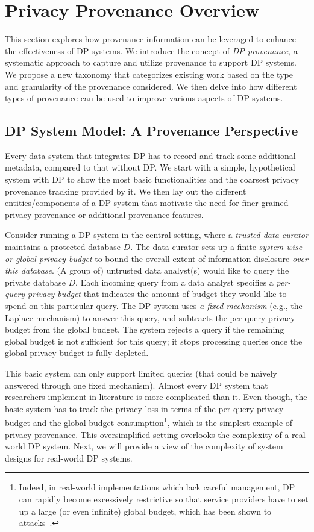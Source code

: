 \section{Privacy Provenance Overview}
This section explores how provenance information can be leveraged to enhance the effectiveness of DP systems. We introduce the concept of \emph{DP provenance}, a systematic approach to capture and utilize provenance to support DP systems. We propose a new taxonomy that categorizes existing work based on the type and granularity of the provenance considered. We then delve into how different types of provenance can be used to improve various aspects of DP systems.

\subsection{DP System Model: A Provenance Perspective}
\label{sec:dpsystem}
Every data system that integrates DP has to record and track some additional metadata, compared to that without DP.
We start with a simple, hypothetical system with DP to show the most basic functionalities and the coarsest privacy provenance tracking provided by it.
We then lay out the different entities/components of a DP system that motivate the need for finer-grained privacy provenance or additional provenance features.

Consider running a DP system in the central setting, where a \emph{trusted data curator} maintains a protected database $D$.
The data curator sets up a finite \emph{system-wise or global privacy budget} to bound the overall extent of information disclosure \emph{over this database}.
(A group of) untrusted data analyst(s) would like to query the private database $D$.
Each incoming query from a data analyst specifies a \emph{per-query privacy budget} that indicates the amount of budget they would like to spend on this particular query. 
The DP system uses \textit{a fixed mechanism} (e.g., the Laplace mechanism) to answer this query, and subtracts the per-query privacy budget from the global budget.
The system rejects a query if the remaining global budget is not sufficient for this query; it stops processing queries once the global privacy budget is fully depleted.

This basic system can only support limited queries (that could be na\"ively answered through one fixed mechanism). 
Almost every DP system that researchers implement in literature is more complicated than it.
Even though, the basic system has to track the privacy loss in terms of the per-query privacy budget and the global budget consumption\footnote{Indeed, in real-world implementations which lack careful management, DP can rapidly become excessively restrictive so that service providers have to set up a large (or even infinite) global budget, which has been shown to attacks~\cite{tang2017privacy}.
}, which is the simplest example of privacy provenance.
This oversimplified setting overlooks the complexity of a real-world DP system.
Next, we will provide a view of the complexity of system designs for real-world DP systems.

